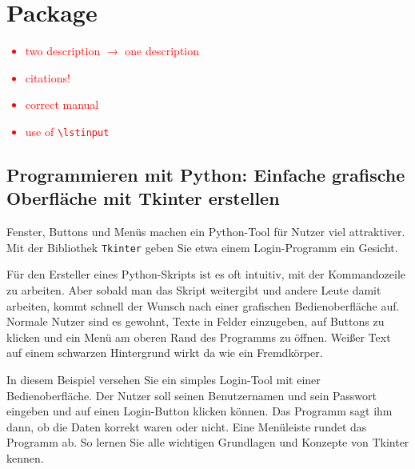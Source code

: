 
%
%
%
%




\chapter{Package }

\textcolor{red}{
	\begin{itemize}
		\item two description $\rightarrow$ one description
		\item citations!
		\item correct manual
		\item use of \texttt{\textbackslash lstinput}
	\end{itemize}
}

\section{Programmieren mit Python: Einfache grafische Oberfläche mit Tkinter erstellen}

Fenster, Buttons und Menüs machen ein Python-Tool für Nutzer viel attraktiver. Mit der Bibliothek \texttt{Tkinter} geben Sie etwa einem Login-Programm ein Gesicht.

Für den Ersteller eines Python-Skripts ist es oft intuitiv, mit der Kommandozeile zu arbeiten. Aber sobald man das Skript weitergibt und andere Leute damit arbeiten, kommt schnell der Wunsch nach einer grafischen Bedienoberfläche auf. Normale Nutzer sind es gewohnt, Texte in Felder einzugeben, auf Buttons zu klicken und ein Menü am oberen Rand des Programms zu öffnen. Weißer Text auf einem schwarzen Hintergrund wirkt da wie ein Fremdkörper.

In diesem Beispiel versehen Sie ein simples Login-Tool mit einer Bedienoberfläche. Der Nutzer soll seinen Benutzernamen und sein Passwort eingeben und auf einen Login-Button klicken können. Das Programm sagt ihm dann, ob die Daten korrekt waren oder nicht. Eine Menüleiste rundet das Programm ab. So lernen Sie alle wichtigen Grundlagen und Konzepte von Tkinter kennen.

